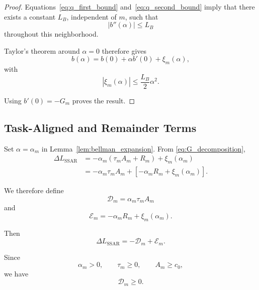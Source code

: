 \begin{proof}
Equations~\eqref{eq:q_first_bound} and~\eqref{eq:q_second_bound} imply that
there exists a constant $L_B$, independent of $m$, such that
\begin{equation}
|b''(\alpha)|
\leq
L_B
\end{equation}
throughout this neighborhood.

Taylor's theorem around $\alpha=0$ therefore gives
\begin{equation}
b(\alpha)
=
b(0)
+
\alpha b'(0)
+
\xi_m(\alpha),
\end{equation}
with
\begin{equation}
|\xi_m(\alpha)|
\leq
\frac{L_B}{2}\alpha^2.
\end{equation}

Using $b'(0)=-G_m$ proves the result.
\end{proof}


\subsection{Task-Aligned and Remainder Terms}

Set $\alpha=\alpha_m$ in
Lemma~\ref{lem:bellman_expansion}. From
\eqref{eq:G_decomposition},
\begin{align}
\Delta L_{\mathrm{SSAR}}
&=
-\alpha_m
\left(
\tau_mA_m+R_m
\right)
+
\xi_m(\alpha_m)
\\
&=
-\alpha_m\tau_mA_m
+
\left[
-\alpha_mR_m+\xi_m(\alpha_m)
\right].
\end{align}

We therefore define
\begin{equation}
\mathcal D_m
=
\alpha_m\tau_mA_m
\label{eq:D_definition}
\end{equation}
and
\begin{equation}
\mathcal E_m
=
-\alpha_mR_m+\xi_m(\alpha_m).
\label{eq:E_definition}
\end{equation}

Then
\begin{equation}
\Delta L_{\mathrm{SSAR}}
=
-\mathcal D_m+\mathcal E_m.
\label{eq:DE_decomposition}
\end{equation}

Since
\begin{equation}
\alpha_m>0,
\qquad
\tau_m\geq0,
\qquad
A_m\geq c_0,
\end{equation}
we have
\begin{equation}
\mathcal D_m\geq0.
\end{equation}

